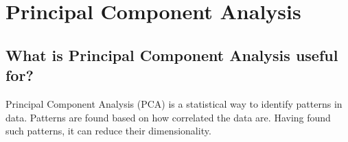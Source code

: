 \documentclass[a4paper]{article}
\begin{document}






\newpage
\tableofcontents
\newpage



\section{Principal Component Analysis}






\subsection{What is Principal Component Analysis useful for?}

Principal Component Analysis (PCA) is a statistical way to identify patterns in data. Patterns are found based on how correlated the data are. Having found such patterns, it can reduce their dimensionality.
\end{document}
